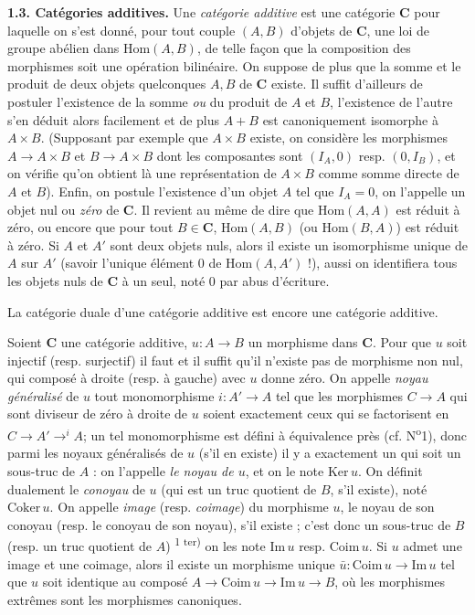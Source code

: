 
\noindent\textbf{1.3. Catégories additives.}
Une \textit{catégorie additive} est une catégorie $\mathbf{C}$ pour laquelle on s'est
donné, pour tout couple $(A,B)$ d'objets de $\mathbf{C}$, une loi de groupe abélien dans
$\mathrm{Hom}(A,B)$, de telle façon que la composition des morphismes soit une
opération bilinéaire.
On suppose de plus que la somme et le produit de deux objets quelconques $A,B$
de $\mathbf{C}$ existe. Il suffit d'ailleurs de postuler l'existence de la somme
\textit{ou} du produit de $A$ et $B$, l'existence de l'autre s'en déduit alors
facilement et de plus $A+B$ est canoniquement isomorphe à $A\times B$.
(Supposant par exemple que $A\times B$ existe, on considère les morphismes
$A\to A\times B$ et $B\to A\times B$ dont les
composantes sont $(I_A,0)$ resp. $(0,I_B)$, et on vérifie qu'on obtient là une
représentation de $A\times B$ comme somme directe de $A$ et $B$). Enfin, on
postule l'existence d'un objet $A$ tel que $I_A=0$, on l'appelle un
objet nul ou \textit{zéro} de $\mathbf{C}$. Il revient au même de dire que
$\mathrm{Hom}(A,A)$ est réduit à zéro, ou encore que pour tout $B\in\mathbf{C}$,
$\mathrm{Hom}(A,B)$ (ou $\mathrm{Hom}(B,A)$) est réduit à zéro. Si $A$ et $A'$
sont deux objets nuls, alors il existe un isomorphisme unique de $A$ sur $A'$
(savoir l'unique élément $0$ de $\mathrm{Hom}(A,A')$ !), aussi on identifiera
tous les objets nuls de $\mathbf{C}$ à un seul, noté $0$ par abus d'écriture.

La catégorie duale d'une catégorie additive est encore une catégorie additive.

Soient $\mathbf{C}$ une catégorie additive, $u:A\to B$ un morphisme dans
$\mathbf{C}$. Pour que $u$ soit injectif (resp. surjectif) il faut et il suffit qu'il
n'existe pas de morphisme non nul, qui composé à droite (resp. à gauche) avec
$u$ donne zéro. On appelle \textit{noyau généralisé} de $u$ tout monomorphisme
$i:A'\to A$ tel que les morphismes $C\to A$ qui sont
diviseur de zéro à droite de $u$ soient exactement ceux qui se factorisent en $C\to A'\mathrel{\mathop{\to}^{i}}A$; un tel monomorphisme est défini à équivalence près (cf.
N\textsuperscript{o}1), donc parmi les noyaux généralisés de $u$ (s'il en
existe) il y a exactement un qui soit un sous-truc de $A$ : on l'appelle
\textit{le noyau de $u$}, et on le note $\mathrm{Ker}\,u$. On définit
dualement le \textit{conoyau} de $u$ (qui est un truc quotient de $B$, s'il
existe), noté $\mathrm{Coker}\,u$. On appelle \textit{image} (resp.
\textit{coimage}) du morphisme $u$, le noyau de son conoyau (resp. le conoyau
de son noyau), s'il existe ; c'est donc un sous-truc de $B$ (resp. un truc
quotient de $A$)%
\textsuperscript{1 ter)}
on les note $\mathrm{Im}\,u$ resp. $\mathrm{Coim}\,u$. Si $u$ admet une image
et une coimage, alors il existe un morphisme unique
$\bar u:\mathrm{Coim}\,u\to\mathrm{Im}\,u$ tel que $u$ soit
identique au composé $A\to\mathrm{Coim}\,u\to\mathrm{Im}\,u\to B$, où les morphismes extrêmes sont les morphismes canoniques.

